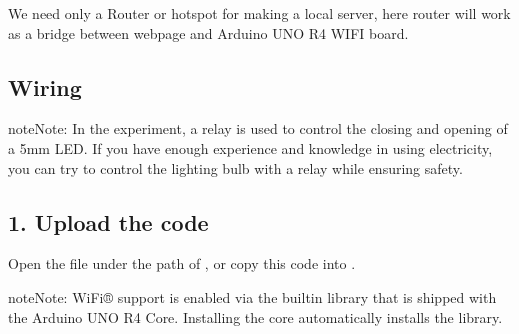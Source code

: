 \documentclass[a4paper,11pt,english]{sphinxmanual}
\begin{document}
\sphinxAtStartPar
We need only a Router or hotspot for making a local server, here router will work as a bridge between web\sphinxhyphen{}page and Arduino UNO R4 WIFI board.



\subsection{Wiring}
\label{\detokenize{Extension_Project/Web_Control_Relay:wiring}}
\begin{sphinxadmonition}{note}{Note:}
\sphinxAtStartPar
In the experiment, a relay is used to control the closing and opening of a 5mm LED. If you have enough experience and knowledge in using electricity, you can try to control the lighting bulb with a relay while ensuring safety.
\end{sphinxadmonition}




\subsection{1. Upload the code}
\label{\detokenize{Extension_Project/Web_Control_Relay:upload-the-code}}
\sphinxAtStartPar
Open the  file under the path of , or copy this code into .

\begin{sphinxadmonition}{note}{Note:}
\sphinxAtStartPar
Wi\sphinxhyphen{}Fi® support is enabled via the built\sphinxhyphen{}in  library that is shipped with the Arduino UNO R4 Core. Installing the core automatically installs the  library.
\end{sphinxadmonition}
\end{document}
